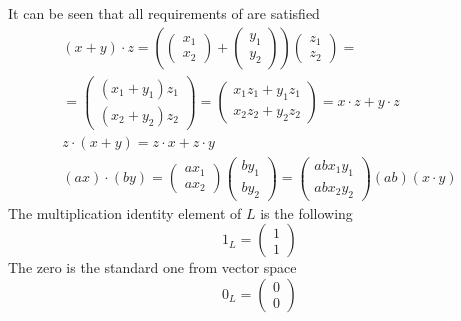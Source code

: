 \begin{example}
  It can be seen that all requirements of  are
  satisfied
  \begin{eqnarray}
    (x + y) \cdot z =
    \left(
    \left(
    \begin{array}{c}
      x_1 \\
      x_2
    \end{array}
    \right)
    +
    \left(
    \begin{array}{c}
      y_1 \\
      y_2
    \end{array}
    \right)
    \right)
    \left(
    \begin{array}{c}
      z_1 \\
      z_2
    \end{array}
    \right) =
    \nonumber \\
    =
    \left(
    \begin{array}{c}
      (x_1 + y_1)z_1 \\
      (x_2 + y_2)z_2
    \end{array}
    \right) =
        \left(
    \begin{array}{c}
      x_1 z_1 + y_1 z_1 \\
      x_2 z_2 + y_2 z_2
    \end{array}
    \right) =
    x \cdot z + y \cdot z
    \nonumber \\
    z \cdot (x + y) = z \cdot x + z \cdot y
    \nonumber \\
    (ax) \cdot (by) =
    \left(
    \begin{array}{c}
      a x_1 \\
      a x_2
    \end{array}
    \right)
    \left(
    \begin{array}{c}
      b y_1 \\
      b y_2
    \end{array}
    \right) =
    \left(
    \begin{array}{c}
      ab x_1 y_1 \\
      ab x_2 y_2
    \end{array}
    \right)
    (ab) (x \cdot y)
    \nonumber
  \end{eqnarray}
  The multiplication identity element of $L$ is the following
  \[
  1_L = 
  \left(
    \begin{array}{c}
      1 \\
      1
    \end{array}
    \right)
  \]
  The zero is the standard one from vector space
  \[
  0_L = 
  \left(
  \begin{array}{c}
    0 \\
    0
  \end{array}
  \right)
  \]


\end{example}
